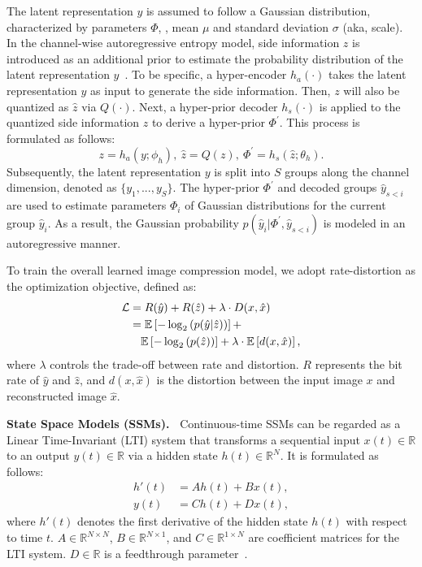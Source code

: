 The latent representation $y$ is assumed to follow a Gaussian distribution, characterized by parameters $\Phi$, \ie, mean $\mu$ and standard deviation $\sigma$ (aka, scale).
In the channel-wise autoregressive entropy model, side information $z$ is introduced as an additional prior to estimate the probability distribution of the latent representation $y$~\cite{minnen2020channel}.
To be specific, a hyper-encoder $h_a(\cdot)$ takes the latent representation $y$ as input to generate the side information.
Then, $z$ will also be quantized as $\hat{z}$ via $Q(\cdot)$. Next, a hyper-prior decoder $h_s(\cdot)$ is applied to the quantized side information $\hat{z}$ to derive a hyper-prior $\Phi^{'}$.
This process is formulated as follows:
\begin{equation}
z = h_a(y; \phi_h),\
\hat{z} = Q(z),\
\Phi^{'} = h_s(\hat{z}; \theta_h).
\label{eq2}
\end{equation}
Subsequently, the latent representation $y$ is split into $S$ groups along the channel dimension, denoted as $\{y_1, ... , y_S\}$.
The hyper-prior $\Phi^{'}$ and decoded groups $\hat{y}_{s<i}$ are used to estimate parameters $\Phi_i$ of Gaussian distributions for the current group $\hat{y}_i$.
As a result, the Gaussian probability $p(\hat{y}_i|\Phi^{'}, \hat{y}_{s<i})$ is modeled in an autoregressive manner.


To train the overall learned image compression model, we adopt rate-distortion as the optimization objective, defined as:
\begin{align}
\mathcal{L} &= R(\hat{y}) + R(\hat{z}) + \lambda \cdot D(x, \hat{x}) \notag \\
            &= \mathbb{E} \left[ -\log_2 \left( p(\hat{y} | \hat{z}) \right) \right] + \notag \\
            &\quad \mathbb{E} \left[ -\log_2 \left( p(\hat{z}) \right) \right] + \lambda \cdot \mathbb{E}\left[ d(x, \hat{x}) \right], 
\label{eq3}
\end{align}
where $\lambda$ controls the trade-off between rate and distortion.
$R$ represents the bit rate of $\hat{y}$ and $\hat{z}$, and $d(x, \hat{x})$ is the distortion between the input image $x$ and reconstructed image $\hat{x}$.


\noindent \textbf{State Space Models (SSMs).~}
Continuous-time SSMs can be regarded as a Linear Time-Invariant (LTI) system that transforms a sequential input $x(t)\in \mathbb{R}$ to an output $y(t)\in \mathbb{R}$ via a hidden state $h(t)\in \mathbb{R}^N$. 
It is formulated as follows:
\begin{equation}
\begin{aligned}
h'(t) &= A h(t) + B x(t), \\
y(t) &= C h(t) + D x(t), 
\label{eq4}
\end{aligned}
\end{equation}
where $h'(t)$ denotes the first derivative of the hidden state $h(t)$ with respect to time $t$. 
$A\in \mathbb{R}^{N \times N}$, $B\in \mathbb{R}^{N \times 1}$, and $C\in \mathbb{R}^{1 \times N}$ are coefficient matrices for the LTI system. 
$D\in \mathbb{R}$ is a feedthrough parameter~\cite{hespanha2018linear}.


